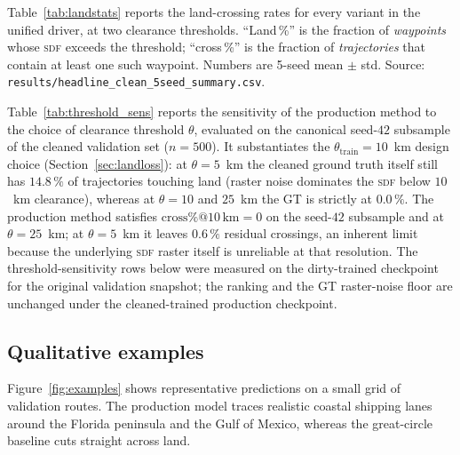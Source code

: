 \documentclass[oneside, a4paper, onecolumn, 11pt]{article}
\newcommand{\sdf}{\textsc{sdf}}
\begin{document}
Table~\ref{tab:landstats} reports the land-crossing rates for every
variant in the unified driver, at two clearance thresholds.
``Land\,\%'' is the fraction of \emph{waypoints} whose \sdf{} exceeds
the threshold; ``cross\,\%'' is the fraction of \emph{trajectories}
that contain at least one such waypoint.  Numbers are 5-seed mean
$\pm$ std.  Source:
\texttt{results/headline\_clean\_5seed\_summary.csv}.

\begin{table}[h]
\centering
\caption{Land-crossing diagnostics on the cleaned corpus.
5-seed mean $\pm$ std on disjoint 500-route subsamples.}
\label{tab:landstats}

\end{table}

Table~\ref{tab:threshold_sens} reports the sensitivity of the
production method to the choice of clearance threshold $\theta$,
evaluated on the canonical seed-$42$ subsample of the cleaned
validation set ($n = 500$).  It substantiates the
$\theta_{\mathrm{train}} = 10$~km design choice
(Section~\ref{sec:landloss}): at $\theta = 5$~km the cleaned ground
truth itself still has $14.8\,\%$ of trajectories touching land
(raster noise dominates the \sdf{} below $10$~km clearance), whereas
at $\theta = 10$ and $25$~km the GT is strictly at $0.0\,\%$.  The
production method satisfies $\mathrm{cross}\%@10\,\mathrm{km} = 0$ on
the seed-$42$ subsample and at $\theta = 25$~km; at $\theta = 5$~km
it leaves $0.6\,\%$ residual crossings, an inherent limit because the
underlying \sdf{} raster itself is unreliable at that resolution.
The threshold-sensitivity rows below were measured on the
dirty-trained checkpoint for the original validation snapshot; the
ranking and the GT raster-noise floor are unchanged under the
cleaned-trained production checkpoint.

\begin{table}[h]
\centering
\caption{Threshold sensitivity sweep on the cleaned corpus
(seed=42, $n=500$). The ground-truth row at $\theta = 5$~km
($14.8\,\%$ cross\%) shows the raster-noise floor.}
\label{tab:threshold_sens}

\end{table}

\subsection{Qualitative examples}

Figure~\ref{fig:examples} shows representative predictions on a small
grid of validation routes.  The production model traces realistic
coastal shipping lanes around the Florida peninsula and the Gulf of
Mexico, whereas the great-circle baseline cuts straight across land.
\end{document}
